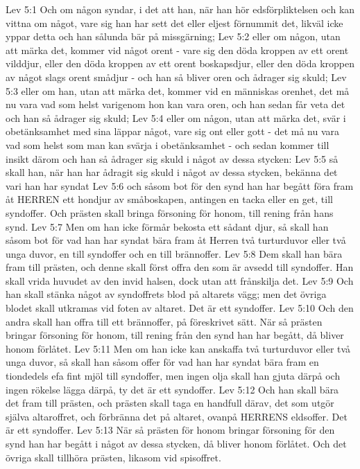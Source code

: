 Lev 5:1  Och om någon syndar, i det att han, när han hör edsförpliktelsen och kan vittna om något, vare sig han har sett det eller eljest förnummit det, likväl icke yppar detta och han sålunda bär på missgärning;
Lev 5:2  eller om någon, utan att märka det, kommer vid något orent - vare sig den döda kroppen av ett orent vilddjur, eller den döda kroppen av ett orent boskapsdjur, eller den döda kroppen av något slags orent smådjur - och han så bliver oren och ådrager sig skuld;
Lev 5:3  eller om han, utan att märka det, kommer vid en människas orenhet, det må nu vara vad som helst varigenom hon kan vara oren, och han sedan får veta det och han så ådrager sig skuld;
Lev 5:4  eller om någon, utan att märka det, svär i obetänksamhet med sina läppar något, vare sig ont eller gott - det må nu vara vad som helst som man kan svärja i obetänksamhet - och sedan kommer till insikt därom och han så ådrager sig skuld i något av dessa stycken:
Lev 5:5  så skall han, när han har ådragit sig skuld i något av dessa stycken, bekänna det vari han har syndat
Lev 5:6  och såsom bot för den synd han har begått föra fram åt HERREN ett hondjur av småboskapen, antingen en tacka eller en get, till syndoffer. Och prästen skall bringa försoning för honom, till rening från hans synd.
Lev 5:7  Men om han icke förmår bekosta ett sådant djur, så skall han såsom bot för vad han har syndat bära fram åt Herren två turturduvor eller två unga duvor, en till syndoffer och en till brännoffer.
Lev 5:8  Dem skall han bära fram till prästen, och denne skall först offra den som är avsedd till syndoffer. Han skall vrida huvudet av den invid halsen, dock utan att frånskilja det.
Lev 5:9  Och han skall stänka något av syndoffrets blod på altarets vägg; men det övriga blodet skall utkramas vid foten av altaret. Det är ett syndoffer.
Lev 5:10  Och den andra skall han offra till ett brännoffer, på föreskrivet sätt. När så prästen bringar försoning för honom, till rening från den synd han har begått, då bliver honom förlåtet.
Lev 5:11  Men om han icke kan anskaffa två turturduvor eller två unga duvor, så skall han såsom offer för vad han har syndat bära fram en tiondedels efa fint mjöl till syndoffer, men ingen olja skall han gjuta därpå och ingen rökelse lägga därpå, ty det är ett syndoffer.
Lev 5:12  Och han skall bära det fram till prästen, och prästen skall taga en handfull därav, det som utgör själva altaroffret, och förbränna det på altaret, ovanpå HERRENS eldsoffer. Det är ett syndoffer.
Lev 5:13  När så prästen för honom bringar försoning för den synd han har begått i något av dessa stycken, då bliver honom förlåtet. Och det övriga skall tillhöra prästen, likasom vid spisoffret.
